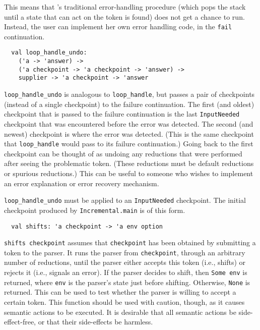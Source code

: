 \documentclass[onecolumn,11pt,nocopyrightspace,preprint]{sigplanconf}
\begin{document}
This means that \menhir's traditional error-handling procedure (which pops the
stack until a state that can act on the \error token is found) does not get a
chance to run. Instead, the user can implement her own error handling code, in
the \verb+fail+ continuation.


\begin{verbatim}
  val loop_handle_undo:
    ('a -> 'answer) ->
    ('a checkpoint -> 'a checkpoint -> 'answer) ->
    supplier -> 'a checkpoint -> 'answer
\end{verbatim}

\verb+loop_handle_undo+ is analogous to \verb+loop_handle+, but passes a pair
of checkpoints (instead of a single checkpoint) to the failure continuation.
%
The first (and oldest) checkpoint that is passed to the failure continuation
is the last \verb+InputNeeded+ checkpoint that was encountered before the
error was detected. The second (and newest) checkpoint is where the error was
detected. (This is the same checkpoint that \verb+loop_handle+ would pass to
its failure continuation.) Going back to the first checkpoint can be thought
of as undoing any reductions that were performed after seeing the problematic
token. (These reductions must be default reductions or spurious reductions.)
This can be useful to someone who wishes to implement an error explanation or
error recovery mechanism.

\verb+loop_handle_undo+ must be applied to an \verb+InputNeeded+ checkpoint.
The initial checkpoint produced by \verb+Incremental.main+ is of this form.


\begin{verbatim}
  val shifts: 'a checkpoint -> 'a env option
\end{verbatim}

\verb+shifts checkpoint+ assumes that \verb+checkpoint+ has been obtained by
submitting a token to the parser. It runs the parser from \verb+checkpoint+,
through an arbitrary number of reductions, until the parser either accepts
this token (i.e., shifts) or rejects it (i.e., signals an error). If the
parser decides to shift, then \verb+Some env+ is returned, where \verb+env+ is
the parser's state just before shifting. Otherwise, \verb+None+ is returned.
This can be used to test whether the parser is willing to accept a certain
token. This function should be used with caution, though, as it causes
semantic actions to be executed. It is desirable that all semantic actions be
side-effect-free, or that their side-effects be harmless.
\end{document}
